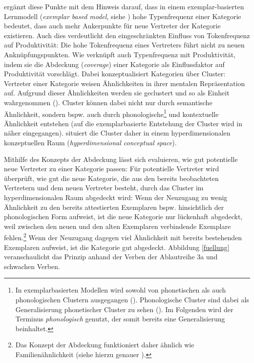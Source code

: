 \textcite[62]{Bybee.2013} ergänzt diese Punkte mit dem Hinweis darauf, dass in einem exemplar-basierten Lernmodell (\textit{exemplar based model}, siehe ) hohe Typenfrequenz einer Kategorie bedeutet, dass auch mehr Ankerpunkte für neue Vertreter der Kategorie existieren. Auch dies verdeutlicht den eingeschränkten Einfluss von Tokenfrequenz auf Produktivität: Die hohe Tokenfrequenz eines Vertreters führt nicht zu neuen Anknüpfungspunkten. Wie \textcite[384]{Bybee.1997} verknüpft auch \textcite[62--63]{Goldberg.2019} Typenfrequenz mit Produktivität, indem sie die Abdeckung (\textit{coverage}) einer Kategorie als Einflussfaktor auf Produktivität vorschlägt. Dabei konzeptualisiert \textcite[16]{Goldberg.2019} Kategorien über Cluster: Vertreter einer Kategorie weisen Ähnlichkeiten in ihrer mentalen Repräsentation auf. Aufgrund dieser Ähnlichkeiten werden sie geclustert und so als Einheit wahrgenommen (\cite[36--37]{Goldberg.2019}). Cluster können dabei nicht nur durch semantische Ähnlichkeit, sondern bspw. auch durch phonologische\footnote{In exemplarbasierten Modellen wird sowohl von phonetischen als auch phonologischen Clustern ausgegangen (\cite[27--29]{Johnson.2007}). Phonologische Cluster sind dabei als Generalisierung phonetischer Cluster zu sehen  (\cite{Johnson.2005, Kirchner.2010}). Im Folgenden wird der Terminus \textit{phonologisch} genutzt, der somit bereits eine Generalisierung beinhaltet.} und kontextuelle Ähnlichkeit entstehen (auf die exemplarbasierte Entstehung der Cluster wird in  näher eingegangen). 
\textcite[16--17]{Goldberg.2019} situiert die Cluster daher in einem hyperdimensionalen konzeptuellen Raum (\textit{hyperdimensional conceptual space}).

   
Mithilfe des Konzepts der Abdeckung lässt sich evaluieren, wie gut potentielle neue Vertreter zu einer Kategorie passen: Für potentielle Vertreter wird überprüft, wie gut die neue Kategorie, die aus den bereits beobachteten Vertretern und dem neuen Vertreter besteht, durch das Cluster im hyperdimensionalen Raum abgedeckt wird: Wenn der Neuzugang zu wenig Ähnlichkeit zu den bereits attestierten Exemplaren bspw. hinsichtlich der phonologischen Form aufweist, ist die neue Kategorie nur lückenhaft abgedeckt, weil zwischen den neuen und den alten Exemplaren verbindende Exemplare fehlen.\footnote{Das Konzept der Abdeckung funktioniert daher ähnlich wie Familienähnlichkeit (siehe hierzu genauer ).} Wenn der Neuzugang dagegen viel Ähnlichkeit mit bereits bestehenden Exemplaren aufweist, ist die Kategorie gut abgedeckt. Abbildung \ref{fuellung} veranschaulicht das Prinzip anhand der Verben der Ablautreihe 3a und schwachen Verben.

